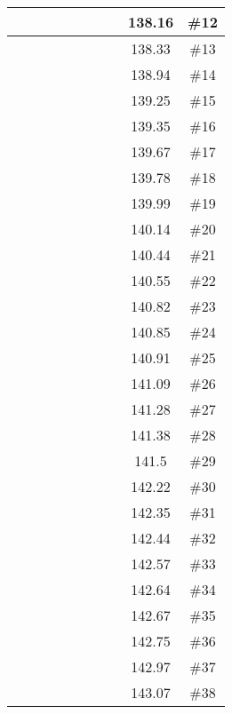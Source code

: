 \begin{center}
\begin{longtable}{|c|c|c|c|c|c|c|c|c|c|}
 \x &  \x &  &  &  \x &  \x &  &  & 138.16 & \#12 \\ \hline
 \x &  &  \x &  &  &  &  &  & 138.33 & \#13 \\ \hline
 \x &  \x &  &  \x &  &  \x &  &  & 138.94 & \#14 \\ \hline
 \x &  \x &  &  &  &  &  &  \x & 139.25 & \#15 \\ \hline
 \x &  \x &  &  &  &  \x &  &  & 139.35 & \#16 \\ \hline
 \x &  \x &  \x &  &  &  &  &  & 139.67 & \#17 \\ \hline
 \x &  &  \x &  &  \x &  \x &  &  \x & 139.78 & \#18 \\ \hline
 \x &  \x &  \x &  \x &  &  &  &  & 139.99 & \#19 \\ \hline
 \x &  &  &  &  &  &  &  \x & 140.14 & \#20 \\ \hline
 \x &  &  &  &  \x &  &  &  \x & 140.44 & \#21 \\ \hline
 \x &  &  &  \x &  &  \x &  &  & 140.55 & \#22 \\ \hline
 \x &  &  \x &  &  &  \x &  &  & 140.82 & \#23 \\ \hline
 \x &  \x &  \x &  &  &  &  &  \x & 140.85 & \#24 \\ \hline
 \x &  \x &  \x &  \x &  &  \x &  &  \x & 140.91 & \#25 \\ \hline
 \x &  \x &  &  &  &  &  &  & 141.09 & \#26 \\ \hline
 \x &  &  \x &  &  &  &  &  \x & 141.28 & \#27 \\ \hline
 \x &  &  \x &  &  \x &  &  &  \x & 141.38 & \#28 \\ \hline
 \x &  &  &  &  \x &  &  &  & 141.5 & \#29 \\ \hline
 \x &  &  &  &  \x &  \x &  &  & 142.22 & \#30 \\ \hline
 \x &  \x &  \x &  \x &  &  \x &  \x &  \x & 142.35 & \#31 \\ \hline
 \x &  \x &  &  \x &  \x &  &  &  \x & 142.44 & \#32 \\ \hline
 \x &  \x &  \x &  &  &  \x &  \x &  \x & 142.57 & \#33 \\ \hline
 \x &  \x &  &  \x &  &  \x &  &  \x & 142.64 & \#34 \\ \hline
 \x &  &  \x &  &  &  \x &  &  \x & 142.67 & \#35 \\ \hline
 \x &  \x &  \x &  &  \x &  &  &  & 142.75 & \#36 \\ \hline
 \x &  &  \x &  \x &  \x &  \x &  &  \x & 142.97 & \#37 \\ \hline
 \x &  \x &  &  &  \x &  &  &  \x & 143.07 & \#38 \\ \hline

\end{longtable}
\end{center}
